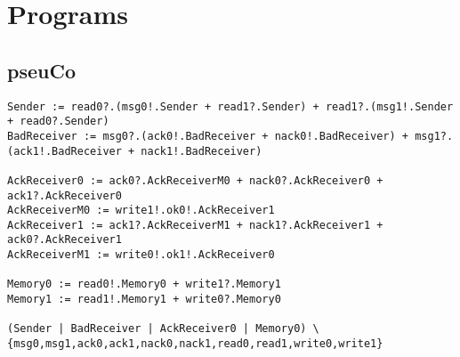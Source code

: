 \section{Programs}\label{sec:prog}

\subsection{pseuCo}\label{sec:pseuco-script}
\begin{verbatim}
Sender := read0?.(msg0!.Sender + read1?.Sender) + read1?.(msg1!.Sender + read0?.Sender)
BadReceiver := msg0?.(ack0!.BadReceiver + nack0!.BadReceiver) + msg1?.(ack1!.BadReceiver + nack1!.BadReceiver)

AckReceiver0 := ack0?.AckReceiverM0 + nack0?.AckReceiver0 + ack1?.AckReceiver0
AckReceiverM0 := write1!.ok0!.AckReceiver1
AckReceiver1 := ack1?.AckReceiverM1 + nack1?.AckReceiver1 + ack0?.AckReceiver1
AckReceiverM1 := write0!.ok1!.AckReceiver0

Memory0 := read0!.Memory0 + write1?.Memory1
Memory1 := read1!.Memory1 + write0?.Memory0

(Sender | BadReceiver | AckReceiver0 | Memory0) \ {msg0,msg1,ack0,ack1,nack0,nack1,read0,read1,write0,write1}
\end{verbatim}


